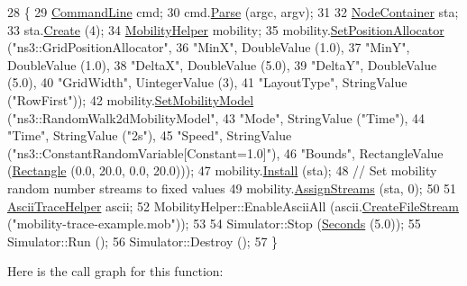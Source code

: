\begin{DoxyCode}
28 \{
29   \hyperlink{classns3_1_1CommandLine}{CommandLine} cmd;
30   cmd.\hyperlink{classns3_1_1CommandLine_a5c10b85b3207e5ecb48d907966923156}{Parse} (argc, argv);
31   
32   \hyperlink{classns3_1_1NodeContainer}{NodeContainer} sta;
33   sta.\hyperlink{classns3_1_1NodeContainer_a787f059e2813e8b951cc6914d11dfe69}{Create} (4);
34   \hyperlink{classns3_1_1MobilityHelper}{MobilityHelper} mobility;
35   mobility.\hyperlink{classns3_1_1MobilityHelper_ac59d5295076be3cc11021566713a28c5}{SetPositionAllocator} (\textcolor{stringliteral}{"ns3::GridPositionAllocator"},
36                                  \textcolor{stringliteral}{"MinX"}, DoubleValue (1.0),
37                                  \textcolor{stringliteral}{"MinY"}, DoubleValue (1.0),
38                                  \textcolor{stringliteral}{"DeltaX"}, DoubleValue (5.0),
39                                  \textcolor{stringliteral}{"DeltaY"}, DoubleValue (5.0),
40                                  \textcolor{stringliteral}{"GridWidth"}, UintegerValue (3),
41                                  \textcolor{stringliteral}{"LayoutType"}, StringValue (\textcolor{stringliteral}{"RowFirst"}));
42   mobility.\hyperlink{classns3_1_1MobilityHelper_a030275011b6f40682e70534d30280aba}{SetMobilityModel} (\textcolor{stringliteral}{"ns3::RandomWalk2dMobilityModel"},
43                              \textcolor{stringliteral}{"Mode"}, StringValue (\textcolor{stringliteral}{"Time"}),
44                              \textcolor{stringliteral}{"Time"}, StringValue (\textcolor{stringliteral}{"2s"}),
45                              \textcolor{stringliteral}{"Speed"}, StringValue (\textcolor{stringliteral}{"ns3::ConstantRandomVariable[Constant=1.0]"}),
46                              \textcolor{stringliteral}{"Bounds"}, RectangleValue (\hyperlink{classns3_1_1Rectangle}{Rectangle} (0.0, 20.0, 0.0, 20.0)));
47   mobility.\hyperlink{classns3_1_1MobilityHelper_a07737960ee95c0777109cf2994dd97ae}{Install} (sta);
48   \textcolor{comment}{// Set mobility random number streams to fixed values}
49   mobility.\hyperlink{classns3_1_1MobilityHelper_a13e35a27577e5927574af6cfdec4c605}{AssignStreams} (sta, 0);
50 
51   \hyperlink{classns3_1_1AsciiTraceHelper}{AsciiTraceHelper} ascii;
52   MobilityHelper::EnableAsciiAll (ascii.\hyperlink{classns3_1_1AsciiTraceHelper_a44960bf2ca32835024eaedd26d1c4f94}{CreateFileStream} (\textcolor{stringliteral}{"mobility-trace-example.mob"}));
53 
54   Simulator::Stop (\hyperlink{group__timecivil_ga33c34b816f8ff6628e33d5c8e9713b9e}{Seconds} (5.0));
55   Simulator::Run ();
56   Simulator::Destroy ();
57 \}
\end{DoxyCode}


Here is the call graph for this function\+:


